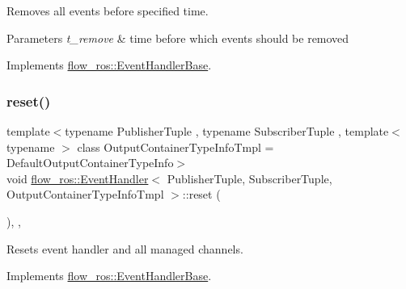 Removes all events before specified time. 


\begin{DoxyParams}{Parameters}
{\em t\+\_\+remove} & time before which events should be removed \\
\hline
\end{DoxyParams}


Implements \hyperlink{classflow__ros_1_1_event_handler_base_a73c65bda396f3d8606e64487a7b30a76}{flow\+\_\+ros\+::\+Event\+Handler\+Base}.

\mbox{\label{classflow__ros_1_1_event_handler_a4b9b96163817d60208a83476148562ff}} 
\subsubsection{\texorpdfstring{reset()}{reset()}}
{\footnotesize\ttfamily template$<$typename Publisher\+Tuple , typename Subscriber\+Tuple , template$<$ typename $>$ class Output\+Container\+Type\+Info\+Tmpl = Default\+Output\+Container\+Type\+Info$>$ \\
void \hyperlink{classflow__ros_1_1_event_handler}{flow\+\_\+ros\+::\+Event\+Handler}$<$ Publisher\+Tuple, Subscriber\+Tuple, Output\+Container\+Type\+Info\+Tmpl $>$\+::reset (\begin{DoxyParamCaption}{ }\end{DoxyParamCaption})\hspace{0.3cm}{\ttfamily [inline]}, {\ttfamily [override]}, {\ttfamily [virtual]}}



Resets event handler and all managed channels. 



Implements \hyperlink{classflow__ros_1_1_event_handler_base_acd6151fd8c25f23c84fc4c815302f584}{flow\+\_\+ros\+::\+Event\+Handler\+Base}.

\mbox{\label{classflow__ros_1_1_event_handler_a445ecc20268a455bf47df8598413ae67}} 
